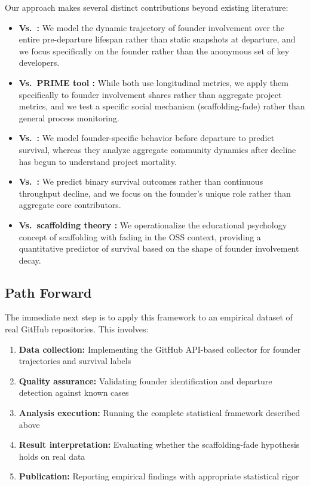 \documentclass[11pt,letterpaper]{article}
\begin{document}
Our approach makes several distinct contributions beyond existing literature:

\begin{itemize}
  \item \textbf{Vs.\ \citet{Avelino2019}:} We model the dynamic trajectory of founder involvement over the entire pre-departure lifespan rather than static snapshots at departure, and we focus specifically on the founder rather than the anonymous set of key developers.
  \item \textbf{Vs.\ PRIME tool \citep{Kaushik2026}:} While both use longitudinal metrics, we apply them specifically to founder involvement shares rather than aggregate project metrics, and we test a specific social mechanism (scaffolding-fade) rather than general process monitoring.
  \item \textbf{Vs.\ \citet{Zhang2026}:} We model founder-specific behavior before departure to predict survival, whereas they analyze aggregate community dynamics after decline has begun to understand project mortality.
  \item \textbf{Vs.\ \citet{Wang2019}:} We predict binary survival outcomes rather than continuous throughput decline, and we focus on the founder's unique role rather than aggregate core contributors.
  \item \textbf{Vs.\ scaffolding theory \citep{Wood1976,Baker2017}:} We operationalize the educational psychology concept of scaffolding with fading in the OSS context, providing a quantitative predictor of survival based on the shape of founder involvement decay.
\end{itemize}

\subsection{Path Forward}

The immediate next step is to apply this framework to an empirical dataset of real GitHub repositories. This involves:

\begin{enumerate}
  \item \textbf{Data collection:} Implementing the GitHub API-based collector for founder trajectories and survival labels
  \item \textbf{Quality assurance:} Validating founder identification and departure detection against known cases
  \item \textbf{Analysis execution:} Running the complete statistical framework described above
  \item \textbf{Result interpretation:} Evaluating whether the scaffolding-fade hypothesis holds on real data
  \item \textbf{Publication:} Reporting empirical findings with appropriate statistical rigor
\end{enumerate}
\end{document}
